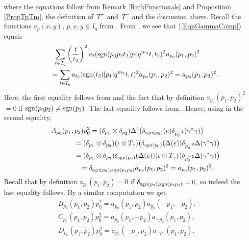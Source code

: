 \documentclass[pdftex]{sigma}
\numberwithin{equation}{section}
\theoremstyle{definition}
\newcommand{\sgn}{\text{\rm sgn}}
\begin{document}
where the equations follow from Remark \ref{RmkFunctionals} and Proposition \ref{PropTpTm}, the def\/inition of~$T^+$ and~$T^-$ and the discussion above.
Recall the functions $a_p(x,y)$, $p, x, y \in I_q$ from \cite[Def\/inition~6.2]{GroKoeKus}. From \cite[Propositions~4.5 and~4.10]{KoeKus}, we see that (\ref{EqnGammaComp}) equals
\begin{gather*}
  \sum_{t \in I_q}  \left(\frac{t}{t_2}\right)^2 a_{t}( \sgn(p_0 p_2 t_2) p_1 q^{m_2} t, t_2)^2 a_{p_0}(p_1, p_2)^2 \nonumber\\
  \qquad{} =
  \sum_{t \in I_q}  a_{t_2}( \sgn(t_2) \vert p_1 \vert q^{m_2} t, t)^2 a_{p_0}(p_1, p_2)^2 =
a_{p_0}(p_1, p_2)^2.\label{EqnACoefficient}
\end{gather*}
Here, the f\/irst equality follows from \cite[equation~(24)]{GroKoeKus} and the fact that by def\/inition $a_{p_0}(p_1, p_2)^2$ $ = 0$ if $\sgn(p_0p_2) \not = \sgn(p_1)$. The last equality follows from \cite[Proposition~6.3]{GroKoeKus}. Hence, using \cite[Section~IX.4, equation~(4)]{TakII} in the second equality,
\begin{gather*}
  A_{p_0}(p_1, p_2) p_0^2 =   (\delta_{p_1} \otimes \delta_{p_2}) \Delta^\natural \big(\delta_{\sgn(p_0)}(e)  \delta_{p_0^{-2}} (\gamma^\ast \gamma) \big)   \\
  \phantom{A_{p_0}(p_1, p_2) p_0^2}{} =
(\delta_{p_1} \otimes \delta_{p_2})(\iota \otimes T_\gamma)\big( \delta_{\sgn(p_0)}( \Delta(e))  \delta_{p_0^{-2}} \Delta(\gamma^\ast \gamma)\big) \\
\phantom{A_{p_0}(p_1, p_2) p_0^2}{}
=
(\delta_{p_1} \otimes \delta_{p_2})\delta_{\sgn(p_0)}( \Delta(e)) (\iota \otimes T_\gamma)\big(  \delta_{p_0^{-2}} \Delta(\gamma^\ast \gamma)\big)  \\
\phantom{A_{p_0}(p_1, p_2) p_0^2}{}
=
 \delta_{\sgn(p_0), \sgn(p_1p_2)} a_{p_0}(p_1, p_2)^2 = a_{p_0}(p_1, p_2)^2.
\end{gather*}
Recall \cite[Def\/inition 3.1]{KoeKus} that by def\/inition $a_{p_0}(p_1, p_2) = 0$ if $\delta_{\sgn(p_0), \sgn(p_1p_2)} = 0$, so indeed the last equality follows.
By a similar computation we get,
\begin{gather*}
 B_{p_0}(p_1, p_2) p_0^2   =  a_{p_0}(p_1, p_2) a_{p_0}(-p_1, -p_2),  \\
 C_{p_0}(p_1, p_2) p_0^2   =  a_{p_0}(p_1, -p_2) a_{-p_0}(p_1, p_2),\\
 D_{p_0}(p_1, p_2) p_0^2   =  a_{p_0}(-p_1, p_2) a_{-p_0}(p_1, p_2).
\end{gather*}
\end{document}
